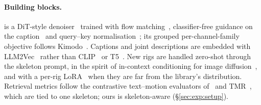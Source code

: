 \paragraph{Building blocks.} \method{} is a DiT-style
denoiser~\citep{peebles2023dit} trained with flow matching~\citep{lipman2023flow,liu2023rectified},
classifier-free guidance on the caption~\citep{ho2022cfg} and query--key
normalisation~\citep{dehghani2023vit22b}; its grouped per-channel-family objective follows
Kimodo~\citep{rempe2026kimodo}. Captions and joint descriptions are embedded with
LLM2Vec~\citep{behnamghader2024llm2vec} rather than CLIP~\citep{radford2021clip} or
T5~\citep{raffel2020t5}. New rigs are handled zero-shot through the skeleton prompt, in the spirit of
in-context conditioning for image diffusion~\citep{wang2023promptdiffusion}, and with a per-rig
LoRA~\citep{hu2022lora} when they are far from the library's distribution. Retrieval metrics follow the contrastive text--motion evaluators
of~\citet{guo2022generating} and TMR~\citep{petrovich2023tmr}, which are tied to one skeleton; ours
is skeleton-aware (\S\ref{sec:exp:setup}).
